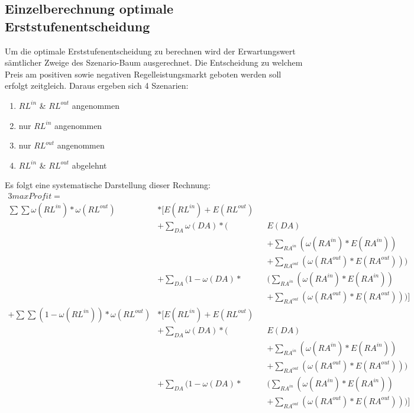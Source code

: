\documentclass{article}
\begin{document}
\subsection{Einzelberechnung optimale Erststufenentscheidung}
Um die optimale Erststufenentscheidung zu berechnen wird der Erwartungswert sämtlicher Zweige des Szenario-Baum ausgerechnet.
Die Entscheidung zu welchem Preis am positiven sowie negativen Regelleistungsmarkt geboten werden soll erfolgt zeitgleich.
Daraus ergeben sich 4 Szenarien:
\begin{enumerate}
    \item $RL^{in}$ \& $RL^{out}$ angenommen
    \item nur $RL^{in}$ angenommen
    \item nur $RL^{out}$ angenommen
    \item $RL^{in}$ \& $RL^{out}$ abgelehnt
\end{enumerate}
Es folgt eine systematische Darstellung dieser Rechnung:
\begin{alignat*}{3}
max Profit = \\
    \sum \sum \omega(RL^{in})* \omega(RL^{out}) &* \Biggl[E(RL^{in}) + E(RL^{out}) \\
        & +\sum_{DA} \omega(DA) *\Biggl(&&E(DA)\\
            &    &&+ \sum_{RA^{in}}( \omega(RA^{in}) * E(RA^{in}))\\
            &    &&+ \sum_{RA^{out}}( \omega(RA^{out}) * E(RA^{out}))\Biggr)\\
        & +\sum_{DA} (1- \omega(DA) * &&\Biggl(\sum_{RA^{in}}( \omega(RA^{in}) * E(RA^{in})) \\
            &    &&+ \sum_{RA^{out}}( \omega(RA^{out}) * E(RA^{out}))\Biggr) \Biggr]\\
    +\sum \sum (1-\omega(RL^{in}))* \omega(RL^{out}) &* \Biggl[E(RL^{in}) + E(RL^{out}) \\
        & +\sum_{DA} \omega(DA) *\Biggl(&&E(DA)\\
            &    &&+ \sum_{RA^{in}}( \omega(RA^{in}) * E(RA^{in}))\\
            &    &&+ \sum_{RA^{out}}( \omega(RA^{out}) * E(RA^{out}))\Biggr)\\
        & +\sum_{DA} (1- \omega(DA) * &&\Biggl(\sum_{RA^{in}}( \omega(RA^{in}) * E(RA^{in})) \\
            &    &&+ \sum_{RA^{out}}( \omega(RA^{out}) * E(RA^{out}))\Biggr) \Biggr]\\
\end{alignat*}
\end{document}
